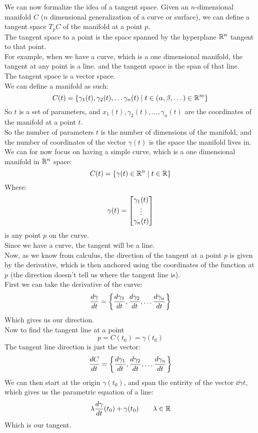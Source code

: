 \documentclass[12pt]{article}
\begin{document}
We can now formalize the idea of a tangent space.
Given an $n$-dimensional manifold $C$
($n$ dimensional
generalization of a curve or surface),
we can define a tangent space
$T_pC$ of the manifold at a point $p$. \\
The tangent space to a point is the space spanned
by the hyperplane $\mathbb{R}^{n}$
tangent to that point. \\
For example, when we have a curve,
which is a one dimensional manifold,
the tangent at any point is a line.
and the tangent space is the span
of that line. \\

The tangent space is a vector space. \\

We can define a manifold as such:
\[ C(t) = \{\gamma_1(t),\gamma_2(t), 
\dots\gamma_n(t) \mid
t \in (\alpha, \beta, \dots) \in \mathbb{R}^m \} \]
So $t$ is a set of parameters,
and $x_1(t),\gamma_2(t), \dots,\gamma_n(t)$
are the coordinates of the manifold at
a point $t$. \\

So the number of parameters $t$ is the number
of dimensions of the manifold,
and the number of coordinates of the
vector $\gamma(t)$ is the space
the manifold lives in. \\

We can for now focus on having a simple
curve, which is a one dimensional manifold
in $\mathbb{R}^n$ space:
\[ C(t) = \{\gamma(t) \in \mathbb{R}^n \mid t \in \mathbb{R} \} \]
Where:
\[ \gamma(t) = \begin{bmatrix} \gamma_1(t) \\ \vdots \\ \gamma_n(t) \end{bmatrix} \]
is any point $p$ on the curve. \\

Since we have a curve, the tangent will be a line. \\
Now, as we know from calculus,
the direction of the tangent at a point $p$
is given by the derivative,
which is then anchored using the coordinates
of the function at $p$
(the direction doesn't tell us where the tangent
line is). \\

First we can take the derivative of the curve:
\[ \dfrac{d\gamma}{dt} = \left\{ \dfrac{d\gamma_1}{dt},
\dfrac{d\gamma_2}{dt}, \dots
\dfrac{d\gamma_n}{dt}  \right\} \]
Which gives us our direction. \\

Now to find the tangent line at a point
\[ p = C(t_0) = \gamma(t_0) \]
The tangent line direction is just the vector:
\[ \dfrac{dC}{dt} = \left\{ \dfrac{d\gamma_1}{dt},
\dfrac{d\gamma_2}{dt}, \dots
\dfrac{d\gamma_n}{dt}  \right\} \]
We can then start at the origin $\gamma(t_0)$,
and span the entirity of the vector $\dd{\gamma}{t}$,
which gives us the parametric equation of a line:
\[ \lambda \dfrac{d\gamma}{dt}(t_0) +
\gamma(t_0) \qquad \lambda \in \mathbb{R} \]
Which is our tangent. \\
\end{document}
